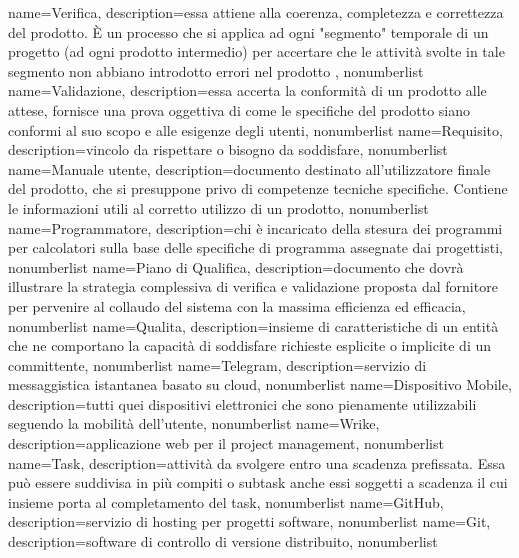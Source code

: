 {
	name={Verifica},
	description={essa attiene alla coerenza, completezza e correttezza del prodotto. È un processo che si applica ad ogni "segmento" temporale di un progetto (ad ogni prodotto intermedio) per accertare che le attività svolte in tale segmento non abbiano introdotto errori nel prodotto
	},
	nonumberlist 
}
{
	name={Validazione},
	description={essa accerta la conformità di un prodotto alle attese, fornisce una prova oggettiva di come le specifiche del prodotto siano conformi al suo scopo e alle esigenze degli utenti},
	nonumberlist 
}
{
	name={Requisito},
	description={vincolo da rispettare o bisogno da soddisfare},
	nonumberlist 
}
{
	name={Manuale utente},
	description={documento destinato all'utilizzatore finale del prodotto, che si presuppone privo di competenze tecniche specifiche. Contiene le informazioni utili al corretto utilizzo di un prodotto},
	nonumberlist 
}
{
	name={Programmatore},
	description={chi è incaricato della stesura dei programmi per calcolatori sulla base delle specifiche di programma assegnate dai progettisti},
	nonumberlist 
}
{
	name={Piano di Qualifica},
	description={documento che dovrà illustrare la strategia complessiva di verifica e validazione proposta dal fornitore per pervenire al collaudo del sistema con la massima efficienza ed efficacia},
	nonumberlist 
}
{
	name={Qualita},
	description={insieme di caratteristiche di un entità che ne comportano la capacità di soddisfare richieste esplicite o implicite di un committente},
	nonumberlist 
}
{
	name={Telegram},
	description={servizio di messaggistica istantanea basato su cloud},
	nonumberlist 
}
{
	name={Dispositivo Mobile},
	description={tutti quei dispositivi elettronici che sono pienamente utilizzabili seguendo la mobilità dell'utente},
	nonumberlist 
}
{
	name={Wrike},
	description={applicazione web per il project management},
	nonumberlist 
}
{
	name={Task},
	description={attività da svolgere entro una scadenza prefissata. Essa può essere suddivisa in più compiti o subtask anche essi soggetti a scadenza il cui insieme porta al completamento del task},
	nonumberlist 
}
{
	name={GitHub},
	description={servizio di hosting per progetti software},
	nonumberlist 
}
{
	name={Git},
	description={software di controllo di versione distribuito},
	nonumberlist
}
